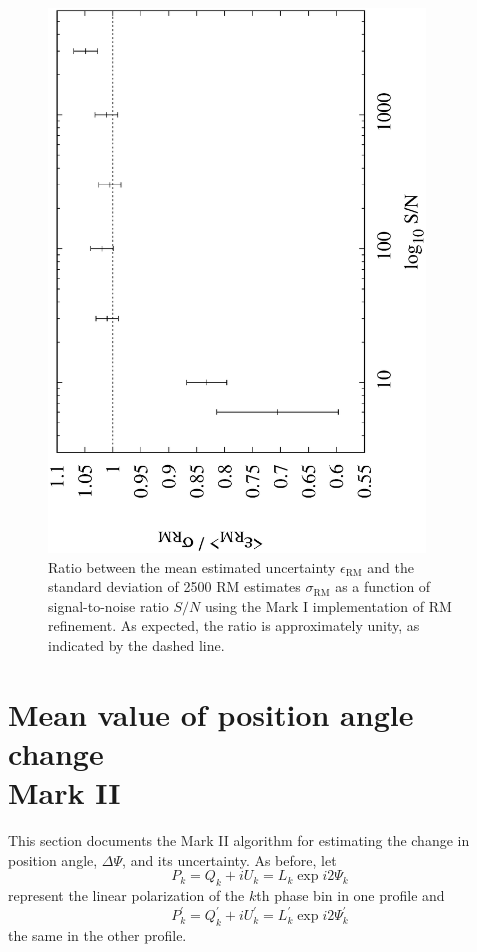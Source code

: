 \documentclass[12pt]{article}
\begin{document}
\begin{figure}
\centerline{\includegraphics[angle=-90,width=100mm]{plots/mark1_error_ratio.eps}}
\caption{\label{fig:mark1_error_ratio}
Ratio between the mean estimated uncertainty $\epsilon_\mathrm{RM}$ and the standard deviation of 2500 RM estimates $\sigma_\mathrm{RM}$ as a function of signal-to-noise ratio $S/N$
using the Mark I implementation of RM refinement.  As expected, the ratio is approximately unity, as indicated
by the dashed line.}
\end{figure}

\section{Mean value of position angle change \\ Mark II}

This section documents the Mark II algorithm for estimating the change in
position angle, $\Delta\Psi$, and its uncertainty.  As before, let
\begin{equation}
P_k = Q_k + i U_k = L_k \exp i2\Psi_k
\end{equation}
represent the linear polarization of the $k$th phase bin in one profile and
\begin{equation}
P^\prime_k = Q^\prime_k + i U^\prime_k = L^\prime_k \exp i2\Psi^\prime_k
\end{equation}
the same in the other profile.  
\end{document}
